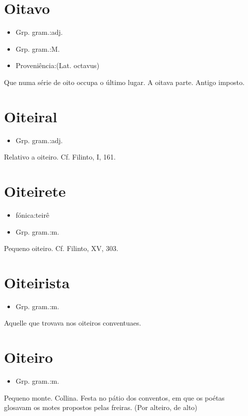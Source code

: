 \section{Oitavo}
\begin{itemize}
\item {Grp. gram.:adj.}
\end{itemize}
\begin{itemize}
\item {Grp. gram.:M.}
\end{itemize}
\begin{itemize}
\item {Proveniência:(Lat. \textunderscore octavus\textunderscore )}
\end{itemize}
Que numa série de oito occupa o último lugar.
A oitava parte.
Antigo imposto.
\section{Oiteiral}
\begin{itemize}
\item {Grp. gram.:adj.}
\end{itemize}
Relativo a oiteiro. Cf. Filinto, I, 161.
\section{Oiteirete}
\begin{itemize}
\item {fónica:teirê}
\end{itemize}
\begin{itemize}
\item {Grp. gram.:m.}
\end{itemize}
Pequeno oiteiro. Cf. Filinto, XV, 303.
\section{Oiteirista}
\begin{itemize}
\item {Grp. gram.:m.}
\end{itemize}
Aquelle que trovava nos oiteiros conventuaes.
\section{Oiteiro}
\begin{itemize}
\item {Grp. gram.:m.}
\end{itemize}
Pequeno monte.
Collina.
Festa no pátio dos conventos, em que os poétas glosavam os motes propostos pelas freiras.
(Por \textunderscore alteiro\textunderscore , de \textunderscore alto\textunderscore )
